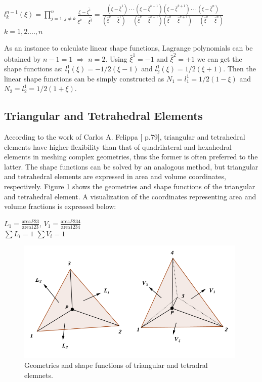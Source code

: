 \begin{center}
	$l_k^{n-1} \left( \xi \right) = \prod_{j = 1, j \neq k}^{n} \frac{\xi - \bar{\xi^1}}{\bar{\xi^k - \bar{\xi^j}}} = \frac{\left(\xi - \bar{\xi}^1\right)\cdot\cdot\cdot \left( \xi - \bar{\xi}^{k-1}\right) \left(\xi - \bar{\xi}^{k+1}\right)\cdot\cdot\cdot \left(\xi -\bar{\xi}^n\right)}{\left(\bar{\xi}^k - \bar{\xi}^1\right)\cdot\cdot\cdot \left( \bar{\xi}^k - \bar{\xi}^{k-1}\right) \left(\bar{\xi}^k - \bar{\xi}^{k+1}\right)\cdot\cdot\cdot \left(\bar{\xi}^k -\bar{\xi}^n\right)}$ \\[4mm] \quad $k = 1,2....,n$
\end{center}
As an instance to calculate linear shape functions, Lagrange polynomials can be obtained by $n-1=1$ $\Rightarrow$ $n=2$. Using $\bar{\xi}^1 = -1$ and $\bar{\xi}^2 = +1$ we can get the shape functions as: $l_1^1\left(\xi\right) = -1/2\left(\xi - 1\right)$ and $l_2^1\left(\xi\right) = 1/2\left(\xi + 1\right)$.
Then the linear shape functions can be simply constructed as $N_1 =l_1^1 = 1/2\left(1-\xi\right)$ and $N_2 = l_2^1 = 1/2\left(1+\xi\right)$.

\subsection{Triangular and Tetrahedral Elements}
According to the work of Carlos A. Felippa [\cite{Felippa} p.79], triangular and tetrahedral elements have higher flexibility than that of quadrilateral and hexahedral elements in meshing complex geometries, thus the former is often preferred to the latter. The shape functions can be solved by an analogous method, but triangular and tetrahedral elements are expressed in area and volume coordinates, respectively. Figure \ref{fig: tri&tet} shows the geometries and shape functions of the triangular and tetrahedral element. A visualization of the coordinates representing area and volume fractions is expressed below:
\begin{center}
	$L_1 = \frac{\text{area}P23}{\text{area}123}$, \quad $V_1 = \frac{\text{area}P234}{\text{area}1234}$ \\[4mm]
	$\sum L_i = 1$ \quad\quad $\sum V_i = 1$
\end{center}
\clearpage
\begin{figure}
	\begin{center}
		\includegraphics[width=11cm,clip]{Tri&Tet.pdf}			
		\caption{Geometries and shape functions of triangular and tetradral elemnets.} \label{fig: tri&tet}
	\end{center}
\end{figure}


